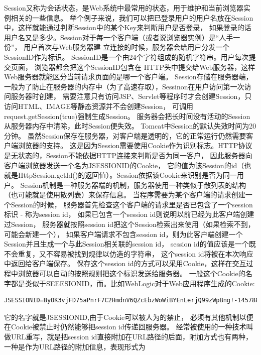 \documentclass{book}
\begin{document}
Session又称为会话状态，是Web系统中最常用的状态，用于维护和当前浏览器实例相关的一些信息。
举个例子来说，我们可以把已登录用户的用户名放在Session中，这样就能通过判断Session中的某个Key来判断用户是否登录，
如果登录的话用户名又是多少。Session对于每一个客户端（或者说浏览器实例）是“人手一份”，
用户首次与Web服务器建 立连接的时候，服务器会给用户分发一个 SessionID作为标识。
SessionID是一个由24个字符组成的随机字符串。用户每次提交页面，
浏览器都会把这个SessionID包含在 HTTP头中提交给Web服务器，这样Web服务器就能区分当前请求页面的是哪一个客户端。
Session存储在服务器端，一般为了防止在服务器的内存中（为了高速存取），Sessinon在用户访问第一次访问服务器时创建，
需要注意只有访问JSP、Servlet等程序时才会创建Session，只访问HTML、IMAGE等静态资源并不会创建Session，
可调用request.getSession(true)强制生成Session。
服务器会把长时间没有活动的Session从服务器内存中清除，此时Session便失效。
Tomcat中Session的默认失效时间为20分钟。
虽然Session保存在服务器，对客户端是透明的，它的正常运行仍然需要客户端浏览器的支持。
这是因为Session需要使用Cookie作为识别标志。HTTP协议是无状态的，Session不能依据HTTP连接来判断是否为同一客户，
因此服务器向客户端浏览器发送一个名为JSESSIONID的Cookie，
它的值为该Session的id（也就是HttpSession.getId()的返回值）。Session依据该Cookie来识别是否为同一用户。
Session机制是一种服务器端的机制，服务器使用一种类似于散列表的结构（也可能就是使用散列表）来保存信息。
当程序需要为某个客户端的请求创建一个Session的时候，
服务器首先检查这个客户端的请求里是否已包含了一个session标识 - 称为session id，
如果已包含一个session id则说明以前已经为此客户端创建过Session，
服务器就按照session id把这个Session检索出来使用（如果检索不到，可能会新建一个），
如果客户端请求不包含session id，则为此客户端创建一个Session并且生成一个与此Session相关联的session id，
session id的值应该是一个既不会重复，又不容易被找到规律以仿造的字符串，
这个session id将被在本次响应中返回给客户端保存。 
保存这个session id的方式可以采用Cookie，这样在交互过程中浏览器可以自动的按照规则把这个标识发送给服务器。
一般这个Cookie的名字都是类似于SEEESIONID，而。比如WebLogic对于Web应用程序生成的Cookie:

\begin{lstlisting}
JSESSIONID=ByOK3vjFD75aPnrF7C2HmdnV6QZcEbzWoWiBYEnLerjQ99zWpBng!-145788764 
\end{lstlisting}

它的名字就是JSESSIONID,由于Cookie可以被人为的禁止，
必须有其他机制以便在Cookie被禁止时仍然能够把session id传递回服务器。
经常被使用的一种技术叫做URL重写，就是把session id直接附加在URL路径的后面，附加方式也有两种，
一种是作为URL路径的附加信息，表现形式为
\end{document}
